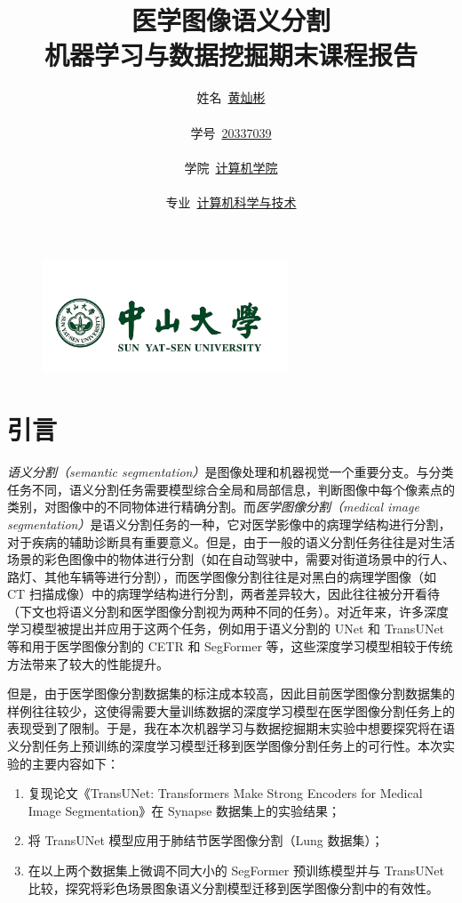 \documentclass[hyperref,a4paper,UTF8]{ctexart}
\title{\vspace{3cm}\Huge\textbf{{医学图像语义分割} \\ \LARGE{机器学习与数据挖掘期末课程报告}}\vspace{6cm}}
\author{
\kaishu\Large{姓名\ \underline{黄灿彬}} \\\\
\kaishu\Large{学号\ \underline{20337039}} \\\\
\kaishu\Large{学院\ \underline{计算机学院}}\\\\
\kaishu\Large{专业\ \underline{计算机科学与技术}}
}
\date{} %
\begin{document}
\begin{figure}
    \centering
    \includegraphics[width=0.65\textwidth]{figures/sysu.png}
\end{figure}

\maketitle

\newpage

\tableofcontents

\thispagestyle{empty} %
\newpage

\section{引言}

\textit{语义分割（semantic segmentation）}是图像处理和机器视觉一个重要分支。与分类任务不同，语义分割任务需要模型综合全局和局部信息，判断图像中每个像素点的类别，对图像中的不同物体进行精确分割。而\textit{医学图像分割（medical image segmentation）}是语义分割任务的一种，它对医学影像中的病理学结构进行分割，对于疾病的辅助诊断具有重要意义。但是，由于一般的语义分割任务往往是对生活场景的彩色图像中的物体进行分割（如在自动驾驶中，需要对街道场景中的行人、路灯、其他车辆等进行分割），而医学图像分割往往是对黑白的病理学图像（如 CT 扫描成像）中的病理学结构进行分割，两者差异较大，因此往往被分开看待（下文也将语义分割和医学图像分割视为两种不同的任务）。对近年来，许多深度学习模型被提出并应用于这两个任务，例如用于语义分割的 UNet\cite{UNet} 和 TransUNet\cite{TransUNet} 等和用于医学图像分割的 CETR\cite{CETR} 和 SegFormer\cite{SegFormer} 等，这些深度学习模型相较于传统方法带来了较大的性能提升。

但是，由于医学图像分割数据集的标注成本较高，因此目前医学图像分割数据集的样例往往较少，这使得需要大量训练数据的深度学习模型在医学图像分割任务上的表现受到了限制。于是，我在本次机器学习与数据挖掘期末实验中想要探究将在语义分割任务上预训练的深度学习模型迁移到医学图像分割任务上的可行性。本次实验的主要内容如下：

\begin{enumerate}[itemsep=2pt,topsep=0pt,parsep=0pt]
    \item 复现论文《TransUNet: Transformers Make Strong Encoders for Medical Image Segmentation》在 Synapse 数据集上的实验结果；
    \item 将 TransUNet 模型应用于肺结节医学图像分割（Lung 数据集）；
    \item 在以上两个数据集上微调不同大小的 SegFormer 预训练模型并与 TransUNet 比较，探究将彩色场景图象语义分割模型迁移到医学图像分割中的有效性。
\end{enumerate}
\end{document}
